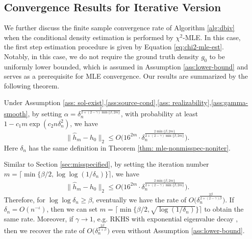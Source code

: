 \subsection{Convergence Results for Iterative Version}

We further discuss the finite sample convergence rate of Algorithm \ref{alg:dbiv} when the conditional density estimation is performed by $\chi^2$-MLE. In this case, the first step estimation procedure is given by Equation \eqref{eq:chi2-mle-est}. Notably, in this case, we do not require the ground truth density $g_0$ to be uniformly lower bounded, which is assumed in Assumption \ref{ass:lower-bound} and serves as a prerequisite for MLE convergence. Our results are summarized by the following theorem. 
\begin{theorem}\label{thm:chi2-mle-result}
    Under Assumption \ref{ass: sol-exist},\ref{ass:source-cond},\ref{ass: realizability},\ref{ass:gamma-smooth}, by setting $\alpha = \delta_n^{\frac{2}{2+ (2-\gamma)\min\{\beta, 2m\}}}$, with probability at least $1- c_1 m\exp(c_2n\delta_n^2)$, we have $$
    \|\hat{h}_m - h_0\|_2 \leq O\big(16^{2m}\cdot \delta_n^{\frac{2\min\{\beta, 2m\}}{2+(2-\gamma)\min\{\beta, 2m\}}}\big).
    $$
    Here $\delta_n$ has the same definition in Theorem \ref{thm: mle-nonmisspec-noniter}.
\end{theorem}
\begin{remark}
Similar to Section \ref{sec:misspecified}, by setting the iteration number $m = \lceil \min\{\beta/ 2, \log\log(1/\delta_n)\} \rceil$, we have $$
   \|\hat{h}_m - h_0\|_2 \leq O\bigg(16^{2m}\cdot \delta_n^{\frac{2\min\{\beta, 2m\}}{2+(2-\gamma)\min\{\beta, 2m\}}}\bigg).
$$
Therefore, for $\log\log \delta_n \geq \beta$, eventually we have the rate of $O\big(\delta_n^{\frac{2\beta}{2+ (2-\gamma) \beta}}\big)$. If $\delta_n = O(n^{-\iota})$, then we can set $m = \lceil \min\{\beta/ 2, \sqrt{\log(1/\delta_n)}\} \rceil$ to obtain the same rate.
Moreover, if $\gamma \rightarrow 1$, e.g.  RKHS with exponential eigenvalue decay \citep[Lemma 5.1]{mendelson2010regularization}, then we recover the rate of $O\big(\delta_n^{\frac{2\beta}{2 + \beta}}\big)$ even without Assumption \ref{ass:lower-bound}.
\end{remark}

